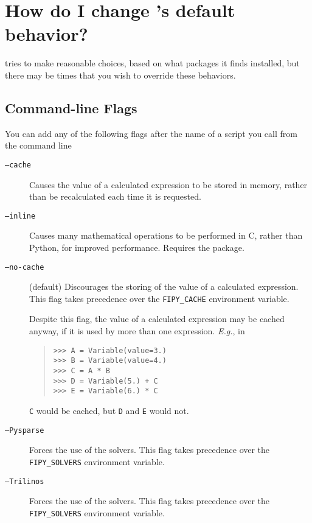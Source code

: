     \section{How do I change \FiPy{}'s default behavior?}
        \label{FAQ-FlagsAndEnvironmentVariables}
        \FiPy{} tries to make reasonable choices, based on what 
        packages it finds installed, but there may be times that you 
        wish to override these behaviors. 
        \subsection{Command-line Flags}
        You can add any of the following flags after the name of a 
        script you call from the command line
        \begin{description}
            \item[\texttt{--cache}] Causes the value of a calculated 
             expression to be stored in memory, 
            rather than be recalculated each time it is requested.
            
            \item[\texttt{--inline}] Causes many mathematical
            operations to be performed in C, rather than Python, for
            improved performance. Requires the \SciPy{} \weave{}
            package. 

            \item[\texttt{--no-cache}] (default) Discourages the
            storing of the value of a calculated 
            expression. This flag takes precedence over the \texttt{FIPY\_CACHE}
            environment variable.
            \begin{reSTadmonition}[Note]
                Despite this flag, the value of a calculated 
                 expression may be cached anyway, if 
                it is used by more than one expression. \emph{E.g.}, 
                in
                \begin{quote}
\begin{verbatim}
>>> A = Variable(value=3.)
>>> B = Variable(value=4.)
>>> C = A * B
>>> D = Variable(5.) + C
>>> E = Variable(6.) * C
\end{verbatim}
                \end{quote}
                \texttt{C} would be cached, but \texttt{D} and 
                \texttt{E} would not.
            \end{reSTadmonition}

            \item[\texttt{--Pysparse}] Forces the use of the 
            \Trilinos{} solvers. This flag takes precedence over the 
            \texttt{FIPY\_SOLVERS} environment variable.

            \item[\texttt{--Trilinos}] Forces the use of the 
            \Trilinos{} solvers. This flag takes precedence over the 
            \texttt{FIPY\_SOLVERS} environment variable.
        \end{description}
        
